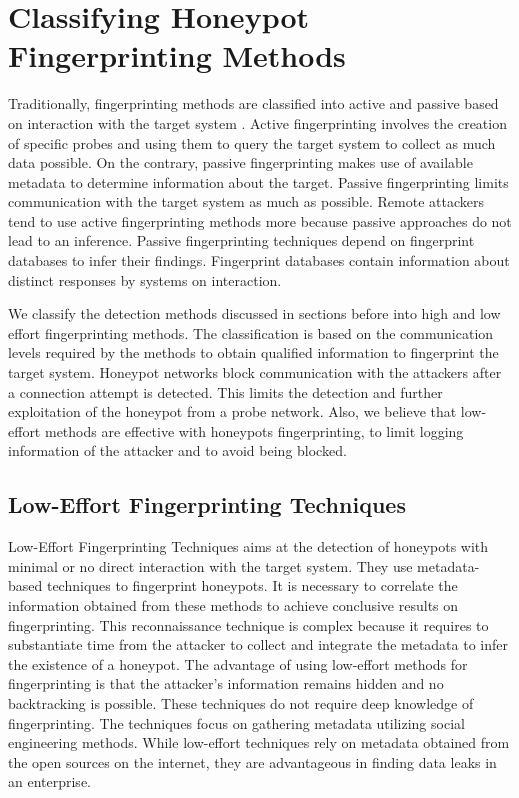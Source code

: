 \section{Classifying Honeypot Fingerprinting Methods}
\label{sec:chfm}

Traditionally, fingerprinting methods are classified into active and passive based on interaction with the target system \cite{spitzner}. Active fingerprinting involves the creation of specific probes and using them to query the target system to collect as much data possible. On the contrary, passive fingerprinting makes use of available metadata to determine information about the target. Passive fingerprinting limits communication with the target system as much as possible. Remote attackers tend to use active fingerprinting methods more because passive approaches do not lead to an inference. Passive fingerprinting techniques depend on fingerprint databases to infer their findings. Fingerprint databases contain information about distinct responses by systems on interaction.
   
We classify the detection methods discussed in sections before into high and low effort fingerprinting methods. The classification is based on the communication levels required by the methods to obtain qualified information to fingerprint the target system. Honeypot networks block communication with the attackers after a connection attempt is detected. This limits the detection and further exploitation of the honeypot from a probe network. Also, we believe that low-effort methods are effective with honeypots fingerprinting, to limit logging information of the attacker and to avoid being blocked. 

 \subsection{Low-Effort Fingerprinting Techniques}
 Low-Effort Fingerprinting Techniques aims at the detection of honeypots with minimal or no direct interaction with the target system. They use metadata-based techniques to fingerprint honeypots. It is necessary to correlate the information obtained from these methods to achieve conclusive results on fingerprinting. This reconnaissance technique is complex because it requires to substantiate time from the attacker to collect and integrate the metadata to infer the existence of a honeypot. The advantage of using low-effort methods for fingerprinting is that the attacker's information remains hidden and no backtracking is possible. These techniques do not require deep knowledge of fingerprinting. The techniques focus on gathering metadata utilizing social engineering methods. While low-effort techniques rely on metadata obtained from the open sources on the internet, they are advantageous in finding data leaks in an enterprise. 
 
